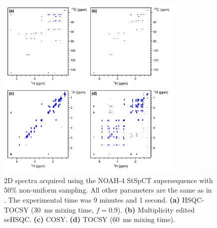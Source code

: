 \begin{figure}
    \centering
    \includegraphics[width=0.8\textwidth]{./figures/stspct_nus.png}
    \caption{
        2D spectra acquired using the NOAH-4 StSpCT supersequence with 50\% non-uniform sampling.
        All other parameters are the same as in .
        The experimental time was 9 minutes and 1 second.
        \textbf{(a)} HSQC-TOCSY (\SI{30}{ms} mixing time, $f = 0.9$).
        \textbf{(b)} Multiplicity edited seHSQC.
        \textbf{(c)} COSY.
        \textbf{(d)} TOCSY (\SI{60}{ms} mixing time).
        \andro{}
    }
    \label{fig:stspct_nus}
\end{figure}

